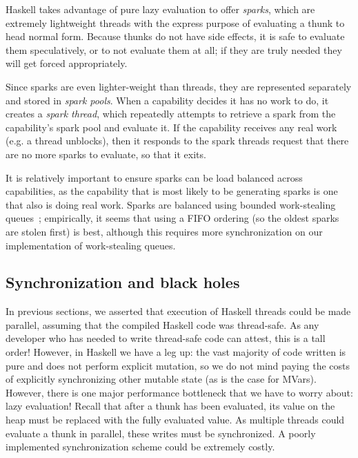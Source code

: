 Haskell takes advantage of pure lazy evaluation to offer \emph{sparks},
which are extremely lightweight threads with the express purpose of
evaluating a thunk to head normal form.  Because thunks do not have
side effects, it is safe to evaluate them speculatively, or to not
evaluate them at all; if they are truly needed they will get forced
appropriately.

Since sparks are even lighter-weight than threads, they are represented
separately and stored in \emph{spark pools}.  When a capability decides
it has no work to do, it creates a \emph{spark thread}, which repeatedly
attempts to retrieve a spark from the capability's spark pool and
evaluate it.  If the capability receives any real work (e.g. a thread
unblocks), then it responds to the spark threads request that there are no
more sparks to evaluate, so that it exits.

It is relatively important to ensure sparks can be load balanced across
capabilities, as the capability that is most likely to be generating
sparks is one that also is doing real work.  Sparks are balanced using
bounded work-stealing queues~\XXX; empirically, it seems that using a FIFO
ordering (so the oldest sparks are stolen first) is best, although this
requires more synchronization on our implementation of work-stealing
queues.


\subsection{Synchronization and black holes} \label{sec:sync}

In previous sections, we asserted that execution of Haskell threads
could be made parallel, assuming that the compiled Haskell code was
thread-safe.  As any developer who has needed to write thread-safe code
can attest, this is a tall order!  However, in Haskell we have a leg up:
the vast majority of code written is pure and does not perform explicit
mutation, so we do not mind paying the costs of explicitly synchronizing
other mutable state (as is the case for MVars). However, there is one
major performance bottleneck that we have to worry about: lazy
evaluation!  Recall that after a thunk has been evaluated, its value on
the heap must be replaced with the fully evaluated value.  As multiple
threads could evaluate a thunk in parallel, these writes must be
synchronized. A poorly implemented synchronization scheme could be
extremely costly.

